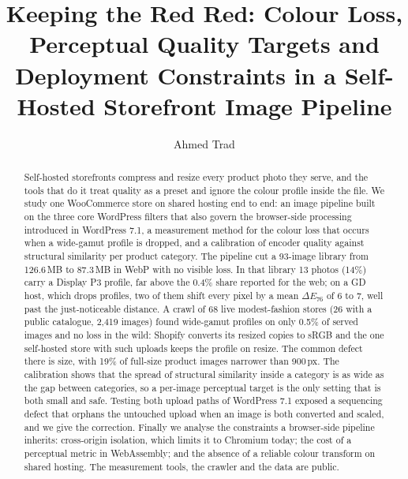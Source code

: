 \documentclass[sigconf,nonacm,screen]{acmart}
\begin{document}
\title[Keeping the Red Red]{Keeping the Red Red: Colour Loss, Perceptual Quality Targets and Deployment Constraints in a Self-Hosted Storefront Image Pipeline}

\author{Ahmed Trad}

\begin{abstract}
Self-hosted storefronts compress and resize every product photo they serve, and the tools that do it treat quality as a preset and ignore the colour profile inside the file. We study one WooCommerce store on shared hosting end to end: an image pipeline built on the three core WordPress filters that also govern the browser-side processing introduced in WordPress 7.1, a measurement method for the colour loss that occurs when a wide-gamut profile is dropped, and a calibration of encoder quality against structural similarity per product category. The pipeline cut a 93-image library from 126.6\,MB to 87.3\,MB in WebP with no visible loss. In that library 13 photos (14\%) carry a Display P3 profile, far above the 0.4\% share reported for the web; on a GD host, which drops profiles, two of them shift every pixel by a mean $\Delta E_{76}$ of 6 to 7, well past the just-noticeable distance. A crawl of 68 live modest-fashion stores (26 with a public catalogue, 2,419 images) found wide-gamut profiles on only 0.5\% of served images and no loss in the wild: Shopify converts its resized copies to sRGB and the one self-hosted store with such uploads keeps the profile on resize. The common defect there is size, with 19\% of full-size product images narrower than 900\,px. The calibration shows that the spread of structural similarity inside a category is as wide as the gap between categories, so a per-image perceptual target is the only setting that is both small and safe. Testing both upload paths of WordPress 7.1 exposed a sequencing defect that orphans the untouched upload when an image is both converted and scaled, and we give the correction. Finally we analyse the constraints a browser-side pipeline inherits: cross-origin isolation, which limits it to Chromium today; the cost of a perceptual metric in WebAssembly; and the absence of a reliable colour transform on shared hosting. The measurement tools, the crawler and the data are public.
\end{abstract}
\end{document}
